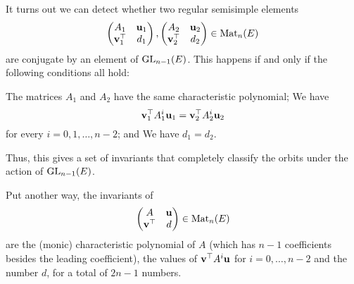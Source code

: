 \begin{remark}
  It turns out we can detect whether two regular semisimple elements
  \[
    \begin{pmatrix} A_1 & \mathbf u_1 \\ \mathbf v_1^\top & d_1 \end{pmatrix},
    \begin{pmatrix} A_2 & \mathbf u_2 \\ \mathbf v_2^\top & d_2 \end{pmatrix}
    \in \operatorname{Mat}_{n}(E)
  \]
  are conjugate by an element of $\operatorname{GL}_{n-1}(E)$.
  This happens if and only if the following conditions all hold:
  \begin{itemize}
    \ii The matrices $A_1$ and $A_2$ have the same characteristic polynomial;
    \ii We have \[ \mathbf v_1^\top A_1^i \mathbf u_1 = \mathbf v_2^\top A_2^i \mathbf u_2 \]
    for every $i = 0, 1, \dots, n-2$; and
    \ii We have $d_1 = d_2$.
  \end{itemize}
  Thus, this gives a set of invariants that completely classify the orbits
  under the action of $\operatorname{GL}_{n-1}(E)$.

  Put another way, the invariants of
  \[ \begin{pmatrix} A & \mathbf u \\ \mathbf v^\top & d \end{pmatrix} \in \operatorname{Mat}_n(E) \]
  are the (monic) characteristic polynomial of $A$
  (which has $n-1$ coefficients besides the leading coefficient),
  the values of $\mathbf v^\top A^i \mathbf u$ for $i = 0, \dots, n-2$
  and the number $d$, for a total of $2n-1$ numbers.
  \label{rem:invariants}
\end{remark}

